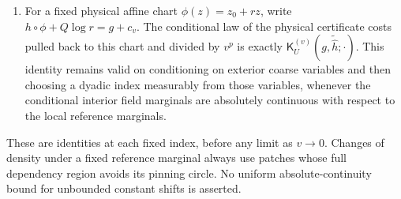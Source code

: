 \begin{proposition}
\begin{enumerate}
$2^{j-i}$ and cost denominator $A_j2^{-ip}$ when $v=2^{-i}$.
Consequently, if the level $j-i$ is also expressed in its own
$A_{j-i}$ units, its deterministic conversion factor is
\begin{equation}\label{tree:eq:zoom_normalization_factor}
 b_i=2^{ip}\lim_j\frac{A_{j-i}}{A_j},
\end{equation}
whenever this positive finite limit is part of the extraction.
\item For a fixed physical affine chart $\phi(z)=z_0+rz$, write
$h\circ\phi+Q\log r=g+c_v$.  The conditional law of the physical
certificate costs pulled back to this chart and divided by $v^p$
is exactly $\mathsf K_U^{(v)}(g,\widetilde{\widehat h};\cdot)$.
This identity remains valid on conditioning on exterior coarse
variables and then choosing a dyadic index measurably from those
variables, whenever the conditional interior field marginals are
absolutely continuous with respect to the local reference marginals.
\end{enumerate}
These are identities at each fixed index, before any limit as $v\to0$.
Changes of density under a fixed reference marginal always use patches
whose full dependency region avoids its pinning circle. No uniform
absolute-continuity bound for unbounded constant shifts is asserted.
\end{proposition}

